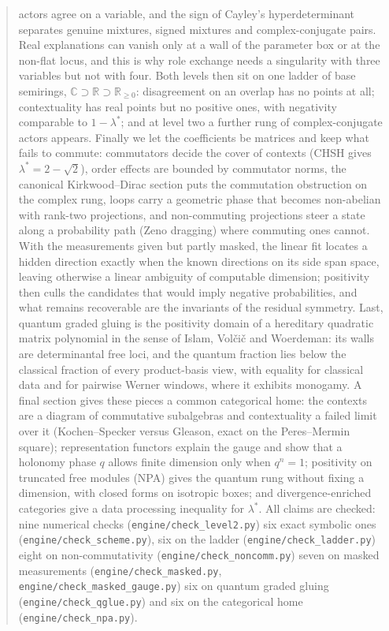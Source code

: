 \documentclass[11pt]{article}
\theoremstyle{definition}\newtheorem{definition}[theorem]{Definition}\newtheorem{remark}[theorem]{Remark}\newtheorem{example}[theorem]{Example}
\newcommand{\R}{\mathbb R}
\begin{document}
\begin{abstract}
actors agree on a variable, and the sign of Cayley's hyperdeterminant separates genuine mixtures, signed mixtures and complex-conjugate
pairs. Real explanations can vanish only at a wall of the parameter box or at the non-flat locus, and this is why role exchange needs a
singularity with three variables but not with four. Both levels then sit on one ladder of base semirings, $\mathbb C\supset\R\supset
\R_{\ge0}$: disagreement on an overlap has no points at all; contextuality has real points but no positive ones, with negativity comparable
to $1-\lambda^*$; and at level two a further rung of complex-conjugate actors appears. Finally we let the coefficients be matrices and
keep what fails to commute: commutators decide the cover of contexts (CHSH gives $\lambda^*=2-\sqrt2$), order effects are bounded by
commutator norms, the canonical Kirkwood--Dirac section puts the commutation obstruction on the complex rung, loops carry a geometric
phase that becomes non-abelian with rank-two projections, and non-commuting projections steer a state along a probability path (Zeno
dragging) where commuting ones cannot. With the measurements given but partly masked, the linear fit locates a hidden direction exactly
when the known directions on its side span space, leaving otherwise a linear ambiguity of computable dimension; positivity then culls the
candidates that would imply negative probabilities, and what remains recoverable are the invariants of the residual symmetry. Last, quantum
graded gluing is the positivity domain of a hereditary quadratic matrix polynomial in the sense of Islam, Volčič and Woerdeman: its walls are
determinantal free loci, and the quantum fraction lies below the classical fraction of every product-basis view, with equality for classical
data and for pairwise Werner windows, where it exhibits monogamy. A final section gives these pieces a common categorical home: the contexts
are a diagram of commutative subalgebras and contextuality a failed limit over it (Kochen--Specker versus Gleason, exact on the Peres--Mermin
square); representation functors explain the gauge and show that a holonomy phase $q$ allows finite dimension only when $q^n=1$; positivity on
truncated free modules (NPA) gives the quantum rung without fixing a dimension, with closed forms on isotropic boxes; and divergence-enriched
categories give a data processing inequality for $\lambda^*$. All claims are checked: nine numerical checks (\texttt{engine/check\_level2.py})
six exact symbolic ones (\texttt{engine/check\_scheme.py}), six on the ladder
(\texttt{engine/check\_ladder.py}) eight on non-commutativity (\texttt{engine/check\_noncomm.py}) seven on masked measurements
(\texttt{engine/check\_masked.py}, \texttt{engine/check\_masked\_gauge.py}) six on quantum graded gluing (\texttt{engine/check\_qglue.py}) and six on the categorical home (\texttt{engine/check\_npa.py}).
\end{abstract}
\end{document}
